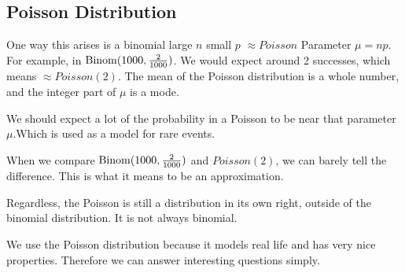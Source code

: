 \documentclass{report}
\begin{document}
\subsection{Poisson Distribution}
One way this arises is a binomial large $n$ small $ p $ $ \approx Poisson$ Parameter $ \mu = np $. For example, in $ \operatorname{Binom}(1000, \frac{2}{1000}) $. We would expect around 2 successes, which means $ \approx Poisson(2) $. The mean of the Poisson distribution is a whole number, and the integer part of $\mu$ is a mode. 

We should expect a lot of the probability in a Poisson to be near that parameter $ \mu $.Which is used as a model for rare events.

When we compare $ \operatorname{Binom}(1000, \frac{2}{1000}) $ and $Poisson(2)$, we can barely tell the difference. This is what it means to be an approximation. 

Regardless, the Poisson is still a distribution in its own right, outside of the binomial distribution. It is not always binomial. 

We use the Poisson distribution because it models real life and has very nice properties. Therefore we can answer interesting questions simply. 
\end{document}
